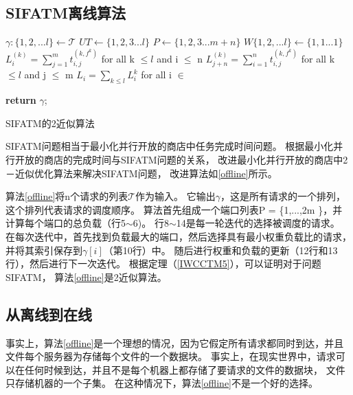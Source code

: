 \subsection{SIFATM离线算法}
\begin{algorithm}
\KwOut{$\gamma$}
 $\gamma:\{1,2,...l\} \gets \mathcal{T}$\;
  \textit{$UT\gets\{1,2,3...l\}$}\;
  \textit{$P\gets\{1,2,3...m+n\}$}\;
  \textit{$W\{1,2,...l\}\gets\{1,1...1\}$}\;
  $L_i^{(k)}= \sum_{j=1}^mt_{i,j}^{(k,f^k)}$  for all k $\le l$ and i $\le$ n\;
  $L_{j+n}^{(k)}= \sum_{i=1}^nt_{i,j}^{(k,f^k)}$ for all k $\le l$ and j $\le$ m\;
  $L_i=\sum_{k \le l}L_i^k$ for all i $\in$\;
  
   \textbf{return} $\gamma$;
\caption{SIFATM的2近似算法}
\label{offline}
\end{algorithm}


SIFATM问题相当于最小化并行开放的商店中任务完成时间问题。
根据最小化并行开放的商店的完成时间与SIFATM问题的关系，
改进最小化并行开放的商店中2－近似优化算法来解决SIFATM问题，
改进算法如\ref{offline}所示。


算法\ref {offline}将n个请求的列表$\mathcal {T} $作为输入。
它输出$\gamma $，这是所有请求的一个排列，这个排列代表请求的调度顺序。
算法首先组成一个端口列表P = \{1,...,2m \}，​​
并计算每个端口的总负载（行5$\sim$6)。
行8$\sim$14是每一轮迭代的选择被调度的请求。
在每次迭代中，首先找到负载最大的端口，然后选择具有最小权重负载比的请求，并将其索引保存到$\gamma [i] $（第10行）中。
随后进行权重和负载的更新（12行和13行），然后进行下一次迭代。
根据定理（\ref{IWCCTM5}），可以证明对于问题SIFATM，
算法\ref{offline}是2近似算法。

\subsection{从离线到在线}

事实上，算法\ref {offline}是一个理想的情况，因为它假定所有请求都同时到达，并且文件每个服务器为存储每个文件的一个数据块。
事实上，在现实世界中，请求可以在任何时候到达，并且不是每个机器上都存储了要请求的文件的数据块，
文件只存储机器的一个子集。 
在这种情况下，算法\ref {offline}不是一个好的选择。

